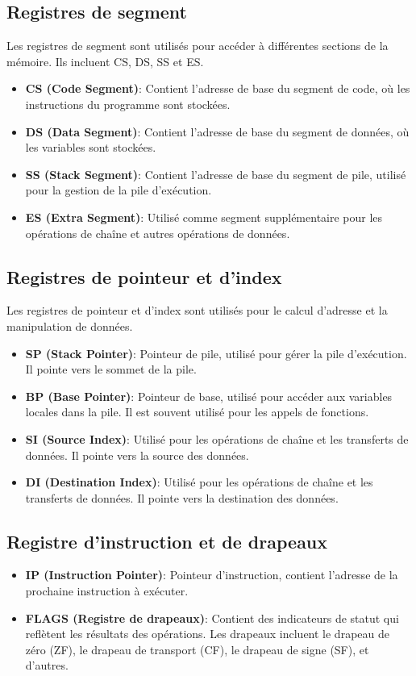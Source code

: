 \documentclass[a4paper, 12pt]{report}
\begin{document}
\subsection{Registres de segment}
Les registres de segment sont utilisés pour accéder à différentes sections de la mémoire. Ils incluent CS, DS, SS et ES.
\begin{itemize}
  \item \textbf{CS (Code Segment)}: Contient l'adresse de base du segment de code, où les instructions du programme sont stockées.
  \item \textbf{DS (Data Segment)}: Contient l'adresse de base du segment de données, où les variables sont stockées.
  \item \textbf{SS (Stack Segment)}: Contient l'adresse de base du segment de pile, utilisé pour la gestion de la pile d'exécution.
  \item \textbf{ES (Extra Segment)}: Utilisé comme segment supplémentaire pour les opérations de chaîne et autres opérations de données.
\end{itemize}

\subsection{Registres de pointeur et d'index}
Les registres de pointeur et d'index sont utilisés pour le calcul d'adresse et la manipulation de données.
\begin{itemize}
  \item \textbf{SP (Stack Pointer)}: Pointeur de pile, utilisé pour gérer la pile d'exécution. Il pointe vers le sommet de la pile.
  \item \textbf{BP (Base Pointer)}: Pointeur de base, utilisé pour accéder aux variables locales dans la pile. Il est souvent utilisé pour les appels de fonctions.
  \item \textbf{SI (Source Index)}: Utilisé pour les opérations de chaîne et les transferts de données. Il pointe vers la source des données.
  \item \textbf{DI (Destination Index)}: Utilisé pour les opérations de chaîne et les transferts de données. Il pointe vers la destination des données.
\end{itemize}

\subsection{Registre d'instruction et de drapeaux}
\begin{itemize}
  \item \textbf{IP (Instruction Pointer)}: Pointeur d'instruction, contient l'adresse de la prochaine instruction à exécuter.
  \item \textbf{FLAGS (Registre de drapeaux)}: Contient des indicateurs de statut qui reflètent les résultats des opérations. Les drapeaux incluent le drapeau de zéro (ZF), le drapeau de transport (CF), le drapeau de signe (SF), et d'autres.
\end{itemize}
\end{document}
